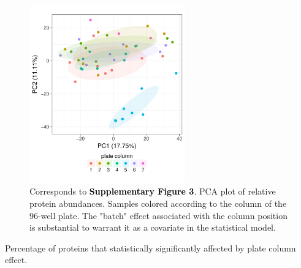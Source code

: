 \documentclass[11pt]{article}\usepackage[]{graphicx}\usepackage[usenames,dvipsnames]{color}
\newenvironment{knitrout}{}{} %
\begin{document}
\begin{figure}[h!]
\center
\begin{minipage}{0.7\textwidth}
\begin{knitrout}
\color{fgcolor}

{\centering \includegraphics[width=0.6\textwidth]{figure/pca-1} 

}



\end{knitrout}
\caption{Corresponds to
\textcolor{black}{\colorbox{highlighter}{\textbf{Supplementary Figure 3}}}.
PCA plot of relative protein abundances. Samples colored according to the
column of the 96-well plate. The "batch" effect associated with the column
position is substantial to warrant it as a covariate in the statistical model.}
\label{fig:NLLBassoc}
\end{minipage}
\end{figure}

Percentage of proteins that statistically significantly affected by plate column effect.



\clearpage
\end{document}
